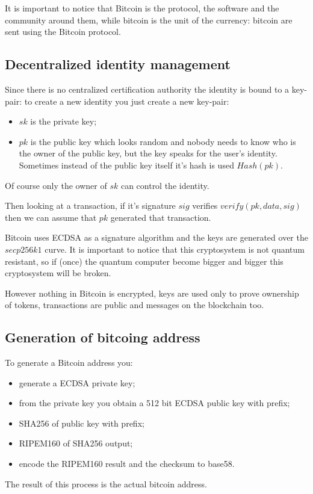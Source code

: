 It is important to notice that Bitcoin is the protocol, the software and the community around them, while bitcoin is the unit of the currency: bitcoin are sent using the Bitcoin protocol.

\subsection{Decentralized identity management}
Since there is no centralized certification authority the identity is bound to a key-pair: to create a new identity you just create a new key-pair:
\begin{itemize}
    \item $sk$ is the private key;
    \item $pk$ is the public key which looks random and nobody needs to know who is the owner of the public key, but the key speaks for the user's identity.
    Sometimes instead of the public key itself it's hash is used $Hash(pk)$.
\end{itemize}
Of course only the owner of $sk$ can control the identity.

Then looking at a transaction, if it's signature $sig$ verifies $verify(pk, data, sig)$ then we can assume that $pk$ generated that transaction. 

Bitcoin uses ECDSA as a signature algorithm and the keys are generated over the $secp256k1$ curve.
It is important to notice that this cryptosystem is not quantum resistant, so if (once) the quantum computer become bigger and bigger this cryptosystem will be broken.

However nothing in Bitcoin is encrypted, keys are used only to prove ownership of tokens, transactions are public and messages on the blockchain too.

\subsection{Generation of bitcoing address}
To generate a Bitcoin address you:
\begin{itemize}
    \item generate a ECDSA private key;
    \item from the private key you obtain a 512 bit ECDSA public key with prefix;
    \item SHA256 of public key with prefix;
    \item RIPEM160 of SHA256 output;
    \item encode the RIPEM160 result and the checksum to base58.
\end{itemize}
The result of this process is the actual bitcoin address.

